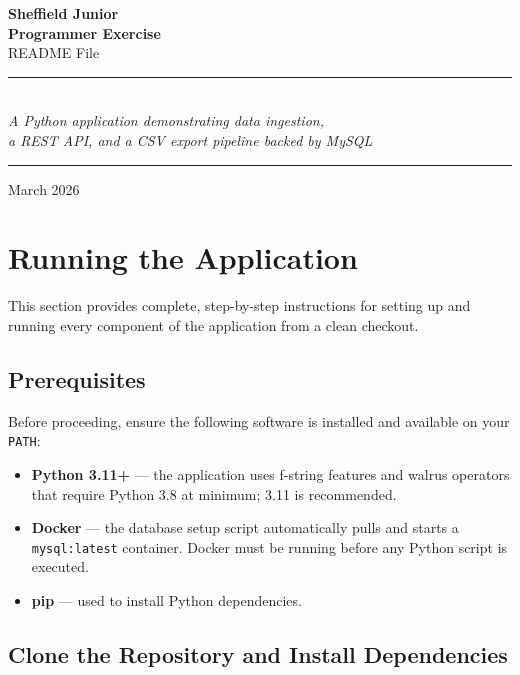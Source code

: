 \documentclass[12pt,a4paper]{article}
\begin{document}
\begin{titlepage}
    \centering
    \vspace*{3cm}
    {\huge\bfseries\color{accentblue} Sheffield Junior\\[0.4em] Programmer Exercise\\[0.4em]}
    {\large README File\\[2.5cm]}
    \rule{\linewidth}{0.5pt}\\[0.6em]
    {\large\itshape A Python application demonstrating data ingestion,\\
    a REST API, and a CSV export pipeline backed by MySQL}\\[0.6em]
    \rule{\linewidth}{0.5pt}
    \vfill
    {\normalsize March 2026}
\end{titlepage}

\tableofcontents
\newpage

\section{Running the Application}

This section provides complete, step-by-step instructions for setting up and
running every component of the application from a clean checkout.

\subsection{Prerequisites}

Before proceeding, ensure the following software is installed and available on
your \texttt{PATH}:

\begin{itemize}[leftmargin=2em]
    \item \textbf{Python 3.11+} --- the application uses f-string features and
          walrus operators that require Python 3.8 at minimum; 3.11 is
          recommended.
    \item \textbf{Docker} --- the database setup script automatically pulls and
          starts a \texttt{mysql:latest} container. Docker must be running
          before any Python script is executed.
    \item \textbf{pip} --- used to install Python dependencies.
\end{itemize}

\subsection{Clone the Repository and Install Dependencies}
\end{document}
